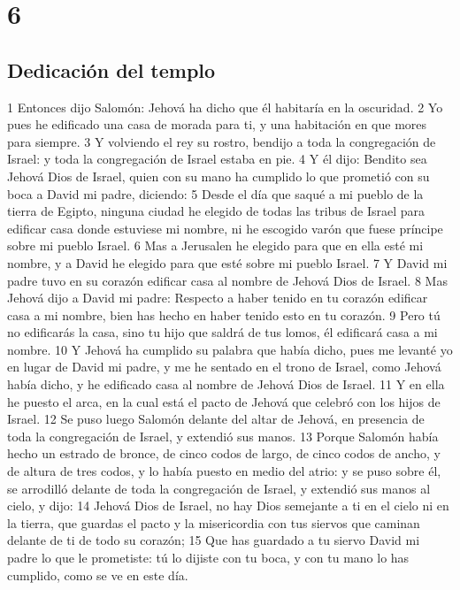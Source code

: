\chapter{6}

\section*{Dedicación del templo}

1 Entonces dijo Salomón: Jehová ha dicho que él habitaría en la oscuridad.
2 Yo pues he edificado una casa de morada para ti, y una habitación en que mores para siempre.
3 Y volviendo el rey su rostro, bendijo  a  toda la congregación de Israel: y toda la congregación de Israel estaba en pie.
4 Y él dijo: Bendito sea Jehová Dios de Israel, quien con su mano ha cumplido lo que prometió con su boca  a  David mi padre, diciendo:
5 Desde el día que saqué a mi pueblo de la tierra de Egipto, ninguna ciudad he elegido de todas las tribus de Israel para edificar casa donde estuviese mi nombre, ni he escogido varón que fuese príncipe sobre mi pueblo Israel.
6 Mas  a  Jerusalen he elegido para que en ella esté mi nombre, y  a  David he elegido para que esté sobre mi pueblo Israel.
7 Y David mi padre tuvo en su corazón edificar casa al nombre de Jehová Dios de Israel.
8 Mas Jehová dijo  a  David mi padre: Respecto  a  haber tenido en tu corazón edificar casa  a  mi nombre, bien has hecho en haber tenido esto en tu corazón.
9 Pero tú no edificarás la casa, sino tu hijo que saldrá de tus lomos, él edificará casa  a  mi nombre. 
10 Y Jehová ha cumplido su palabra que había dicho, pues me levanté yo en lugar de David mi padre, y me he sentado en el trono de Israel, como Jehová había dicho, y he edificado casa al nombre de Jehová Dios de Israel.
11 Y en ella he puesto el arca, en la cual está el pacto de Jehová que celebró con los hijos de Israel.
12 Se puso luego Salomón delante del altar de Jehová, en presencia de toda la congregación de Israel, y extendió sus manos.
13 Porque Salomón había hecho un estrado de bronce, de cinco codos   de largo, de cinco codos de ancho, y de altura de tres codos, y lo había puesto en medio del atrio: y se puso sobre él, se arrodilló delante de toda la congregación de Israel, y extendió sus manos al cielo, y dijo:
14 Jehová Dios de Israel, no hay Dios semejante  a  ti en el cielo ni en la tierra, que guardas el pacto y la misericordia con tus siervos que caminan delante de ti de todo su corazón;
15 Que has guardado  a  tu siervo David mi padre lo que le prometiste: tú lo dijiste con tu boca, y con tu mano lo has cumplido, como se ve en este día.

